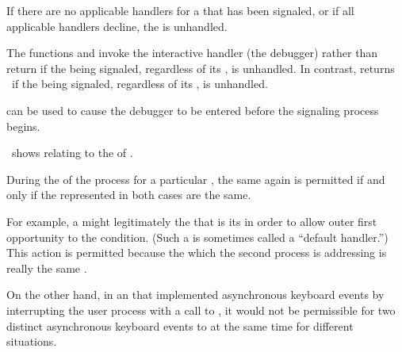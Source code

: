 If there are no applicable handlers for a  that
has been signaled, or if all applicable handlers decline, the
 is unhandled.
 
The functions  and  invoke the
interactive  handler (the debugger) rather than
return if the  being signaled, regardless of
its , is unhandled.  In contrast, 
returns \nil\ if the  being signaled,
regardless of its , is unhandled.

 can be used to cause the
debugger to be entered before the signaling process begins.
 
\Thenextfigure\ shows  relating to
the  of .



During the  of the  process for
a particular  , 
 the same   again
is permitted if and only if the  represented in both
cases are the same.

For example, a  might legitimately  
the   that is its 
in order to allow outer  first opportunity to  
the condition.  (Such a  is sometimes called a ``default handler.'')
This action is permitted because the  which the second
 process is addressing is really the same .

On the other hand, in an  that implemented asynchronous 
keyboard events by interrupting the user process with a call to ,
it would not be permissible for two distinct asynchronous keyboard events
to    
at the same time for different 
situations.
 
\endsubsubsubsection%

\endsubsubsection%
 
